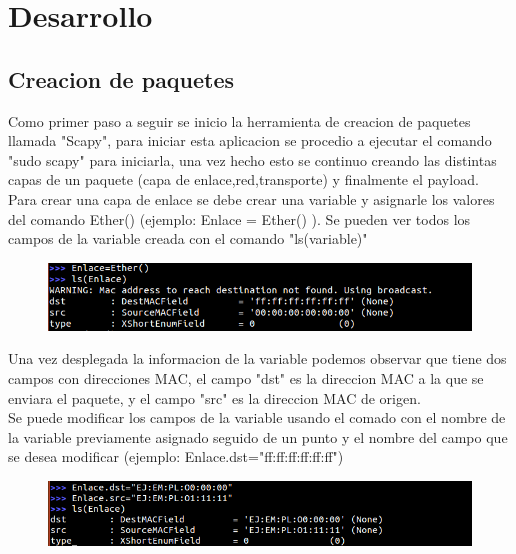 \documentclass[spanish]{udpreport}
\begin{document}
\chapter{Desarrollo}

\section{Creacion de paquetes}
\large Como primer paso a seguir se inicio la herramienta de creacion de paquetes llamada "Scapy", para iniciar esta aplicacion se procedio a ejecutar el comando "sudo scapy" 
para iniciarla, una vez hecho esto se continuo creando las distintas capas de un paquete (capa de enlace,red,transporte) y finalmente el payload.\\

Para crear una capa de enlace se debe crear una variable y asignarle los valores del comando Ether() (ejemplo: Enlace = Ether() ). Se pueden ver todos los campos de la variable creada con el comando "ls(variable)"\\
\begin{figure}[H]
\begin{center}
\includegraphics[scale=0.7]{images/1.png}
\end{center}
\end{figure}

Una vez desplegada la informacion de la variable podemos observar que tiene dos campos con direcciones MAC, el campo "dst" es la direccion MAC a la que se enviara el paquete, y el campo "src" es la direccion MAC de origen.\\

Se puede modificar los campos de la variable usando el comado con el nombre de la variable previamente asignado seguido de un punto y el nombre del campo que se desea modificar (ejemplo: Enlace.dst="ff:ff:ff:ff:ff:ff")\\

\begin{figure}[H]
\begin{center}
\includegraphics[scale=0.7]{images/6.png}
\end{center}
\end{figure}
\end{document}
